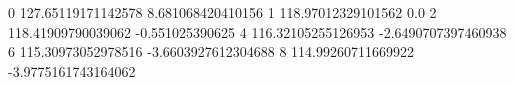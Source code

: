0 127.65119171142578 8.681068420410156
1 118.97012329101562 0.0
2 118.41909790039062 -0.551025390625
4 116.32105255126953 -2.6490707397460938
6 115.30973052978516 -3.6603927612304688
8 114.99260711669922 -3.9775161743164062
